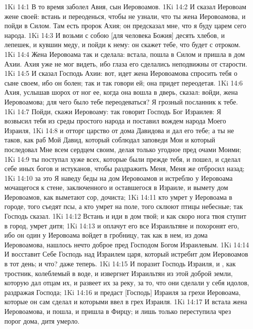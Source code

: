 \vs 1Ki 14:1 В то время заболел Авия, сын Иеровоамов.
\vs 1Ki 14:2 И сказал Иеровоам жене своей: встань и переоденься, чтобы не узнали, что ты жена Иеровоамова, и пойди в Силом. Там есть пророк Ахия; он предсказал мне, что я буду царем сего народа.
\vs 1Ki 14:3 И возьми с собою [для человека Божия] десять хлебов, и лепешек, и кувшин меду, и пойди к нему: он скажет тебе, что будет с отроком.
\vs 1Ki 14:4 Жена Иеровоама так и сделала: встала, пошла в Силом и пришла в дом Ахии. Ахия уже не мог видеть, ибо глаза его сделались неподвижны от старости.
\vs 1Ki 14:5 И сказал Господь Ахии: вот, идет жена Иеровоамова спросить тебя о сыне своем, ибо он болен; так и так говори ей; она придет переодетая.
\vs 1Ki 14:6 Ахия, услышав шорох от ног ее, когда она вошла в дверь, сказал: войди, жена Иеровоамова; для чего было тебе переодеваться? Я грозный посланник к тебе.
\vs 1Ki 14:7 Пойди, скажи Иеровоаму: так говорит Господь Бог Израилев: Я возвысил тебя из среды простого народа и поставил вождем народа Моего Израиля,
\vs 1Ki 14:8 и отторг царство от дома Давидова и дал его тебе; а ты не таков, как раб Мой Давид, который соблюдал заповеди Мои и который последовал Мне всем сердцем своим, делая только угодное пред очами Моими;
\vs 1Ki 14:9 ты поступал хуже всех, которые были прежде тебя, и пошел, и сделал себе иных богов и истуканов, чтобы раздражить Меня, Меня же отбросил назад;
\vs 1Ki 14:10 за это Я наведу беды на дом Иеровоамов и истреблю у Иеровоама  мочащегося к стене, заключенного и оставшегося в Израиле, и вымету дом Иеровоамов, как выметают сор, дочиста;
\vs 1Ki 14:11 кто умрет у Иеровоама в городе, того съедят псы, а кто умрет на поле, того склюют птицы небесные; так Господь сказал.
\vs 1Ki 14:12 Встань и иди в дом твой; и как скоро нога твоя ступит в город, умрет дитя;
\vs 1Ki 14:13 и оплачут его все Израильтяне и похоронят его, ибо он один у Иеровоама войдет в гробницу, так как в нем, из дома Иеровоамова, нашлось нечто доброе пред Господом Богом Израилевым.
\vs 1Ki 14:14 И восставит Себе Господь над Израилем царя, который истребит дом Иеровоамов в тот день; и что? даже теперь.
\vs 1Ki 14:15 И поразит Господь Израиля, и , как тростник, колеблемый в воде, и извергнет Израильтян из этой доброй земли, которую дал отцам их, и развеет их за реку, за то, что они сделали у себя идолов, раздражая Господа;
\vs 1Ki 14:16 и предаст [Господь] Израиля за грехи Иеровоама, которые он сам сделал и которыми ввел в грех Израиля.
\vs 1Ki 14:17 И встала жена Иеровоамова, и пошла, и пришла в Фирцу; и лишь только переступила чрез порог дома, дитя умерло.
